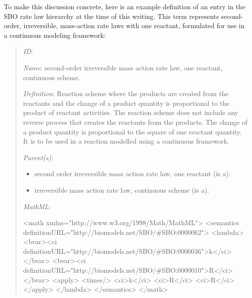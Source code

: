 To make this discussion concrete, here is an example definition of
an entry in the SBO rate law hierarchy at the time of this
writing.  This term represents second-order, irreversible,
mass-action rate laws with one reactant, formulated for use in a
continuous modeling framework:
\begin{quote}
\begin{description}

\item \emph{ID}: 

\item \emph{Name}: second-order irreversible mass action rate law,
  one reactant, continuous scheme.

\item \emph{Definition}: Reaction scheme where the products are
  created from the reactants and the change of a product quantity
  is proportional to the product of reactant activities. The
  reaction scheme does not include any reverse process that
  creates the reactants from the products. The change of a product
  quantity is proportional to the square of one reactant quantity.
  It is to be used in a reaction modelled using a continuous
  framework.

\item \emph{Parent(s)}: 
  \begin{itemize}
  \item {} second order irreversible mass action
    rate law, one reactant (is a).
  \item {}
    irreversible mass action rate law, continuous scheme (is a).
  \end{itemize}
  
\item \emph{MathML}:
\begin{example}
<math xmlns="http://www.w3.org/1998/Math/MathML">
   <semantics definitionURL="http://biomodels.net/SBO/#SBO:0000062">
      <lambda>
         <bvar><ci definitionURL="http://biomodels.net/SBO/#SBO:0000036">k</ci></bvar>
         <bvar><ci definitionURL="http://biomodels.net/SBO/#SBO:0000010">R</ci></bvar>
         <apply>
            <times/>
            <ci>k</ci>
            <ci>R</ci>
            <ci>R</ci>
         </apply>
      </lambda>
   </semantics>
</math>
\end{example}

\end{description}
\end{quote}

